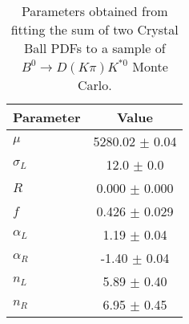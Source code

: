 \begin{table}
  \centering
  \begin{tabular}{lc}
      \toprule
      Parameter & Value \\
      \midrule
      $\mu$ & 5280.02 $\pm$ 0.04 \\
      $\sigma_L$ & 12.0 $\pm$ 0.0 \\
      $R$ & 0.000 $\pm$ 0.000 \\
      $f$ & 0.426 $\pm$ 0.029 \\
      $\alpha_L$ & 1.19 $\pm$ 0.04 \\
      $\alpha_R$ & -1.40 $\pm$ 0.04 \\
      $n_L$ & 5.89 $\pm$ 0.40 \\
      $n_R$ & 6.95 $\pm$ 0.45 \\
  \bottomrule
  \end{tabular}
  \caption{Parameters obtained from fitting the sum of two Crystal Ball PDFs to a sample of $B^0 \to D(K\pi)K^{*0}$ Monte Carlo.}
\label{tab:signal_Kpi_MC_params}
\end{table}

